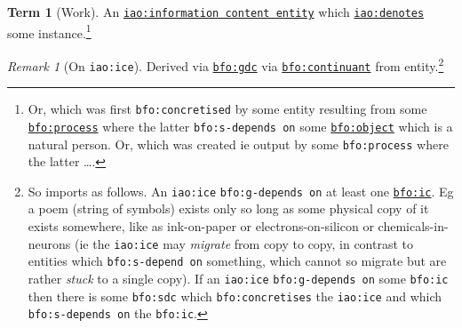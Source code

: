 \documentclass{amsart}%
\newcommand{\code}[1]{\texttt{#1}}%
\newcommand{\mention}[1]{\textit{#1}}%
\theoremstyle{plain}
\theoremstyle{definition}
\theoremstyle{remark}
\theoremstyle{definition}
\newtheorem{term}{Term}[subsection]%
\theoremstyle{remark}
\newtheorem*{term-note}{Remark}
\begin{document}
\begin{term}[Work]
\label{term:work}
An \href{http://purl.obolibrary.org/obo/IAO_0000030}{\code{iao:information content entity}} which \href{http://purl.obolibrary.org/obo/IAO_0000219}{\code{iao:denotes}} some instance.\footnote{Or, which was first \code{bfo:concretised} by some entity resulting from some \href{http://purl.obolibrary.org/obo/BFO_0000015}{\code{bfo:process}} where the latter \code{bfo:s-depends on} some \href{http://purl.obolibrary.org/obo/BFO_0000030}{\code{bfo:object}} which is a natural person. Or, which was created ie output by some \code{bfo:process} where the latter \ldots.}%
\begin{term-note}[On \code{iao:ice}]
Derived via \href{http://purl.obolibrary.org/obo/BFO_0000031}{\code{bfo:gdc}} via \href{http://purl.obolibrary.org/obo/BFO_0000002}{\code{bfo:continuant}} from entity.\footnote{So imports as follows. An \code{iao:ice} \code{bfo:g-depends on} at least one \href{http://purl.obolibrary.org/obo/BFO_0000004}{\code{bfo:ic}}. Eg a poem (string of symbols) %
%
%
exists only so long as some physical copy of it exists somewhere, like as ink-on-paper or electrons-on-silicon or chemicals-in-neurons (ie the \code{iao:ice} may \mention{migrate} from copy to copy, in contrast to entities which \code{bfo:s-depend on} something, which cannot so migrate but are rather \mention{stuck} to a single copy). If an \code{iao:ice} \code{bfo:g-depends on} some \code{bfo:ic} then there is some \code{bfo:sdc} which \code{bfo:concretises} the \code{iao:ice} and which \code{bfo:s-depends on} the \code{bfo:ic}. %
}
\end{term-note}
\end{term}
\end{document}
